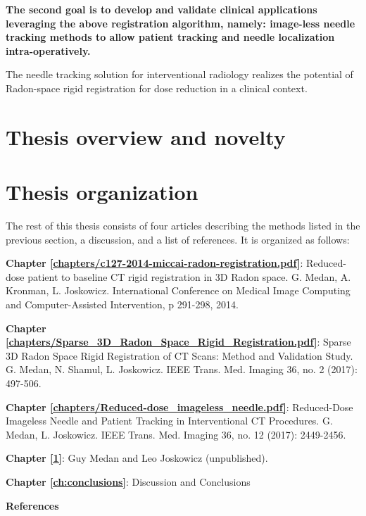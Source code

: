 \textbf{The second goal is to develop and validate clinical applications leveraging the above registration algorithm, namely: image-less needle tracking methods to allow patient tracking and needle localization intra-operatively.}

The needle tracking solution for interventional radiology realizes the potential of Radon-space rigid registration for dose reduction in a clinical context.

\section{Thesis overview and novelty}


\section{Thesis organization}

The rest of this thesis consists of four articles describing the methods listed in the previous section, a discussion, and a list of references. It is organized as follows: 

\textbf{Chapter \ref{chapters/c127-2014-miccai-radon-registration.pdf}}: Reduced-dose patient to baseline CT rigid registration in 3D Radon space.
G. Medan, A. Kronman, L. Joskowicz. International Conference on Medical Image Computing and Computer-Assisted Intervention, p 291-298, 2014.

\textbf{Chapter \ref{chapters/Sparse_3D_Radon_Space_Rigid_Registration.pdf}}: Sparse 3D Radon Space Rigid Registration of CT Scans: Method and Validation Study.
G. Medan, N. Shamul, L. Joskowicz. IEEE Trans. Med. Imaging 36, no. 2 (2017): 497-506.

\textbf{Chapter \ref{chapters/Reduced-dose_imageless_needle.pdf}}: Reduced-Dose Imageless Needle and Patient Tracking in Interventional CT Procedures.
G. Medan, L. Joskowicz. IEEE Trans. Med. Imaging 36, no. 12 (2017): 2449-2456.

\textbf{Chapter \ref{1}}: Guy Medan and Leo Joskowicz (unpublished). %

\textbf{Chapter \ref{ch:conclusions}}: Discussion and Conclusions

\textbf{References}